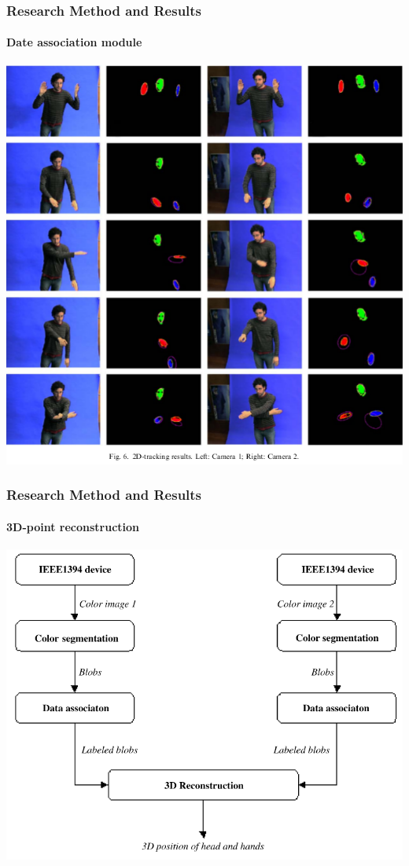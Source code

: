 \documentclass{beamer}
\begin{document}

\begin{frame}
\frametitle{Research Method and Results }
\framesubtitle{Date association module}
\includegraphics[scale=0.35]{Workspace2.png}

\end{frame}



\begin{frame}
\frametitle{Research Method and Results }
\framesubtitle{3D-point reconstruction}
\includegraphics[scale=0.3]{Workspace3.png}

\end{frame}
\end{document}

